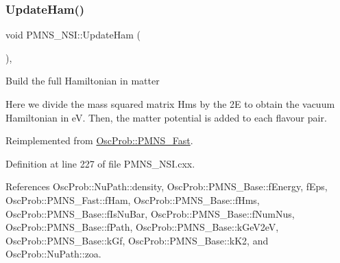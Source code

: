 \subsubsection{\texorpdfstring{Update\+Ham()}{UpdateHam()}}
{\footnotesize\ttfamily void P\+M\+N\+S\+\_\+\+N\+S\+I\+::\+Update\+Ham (\begin{DoxyParamCaption}{ }\end{DoxyParamCaption})\hspace{0.3cm}{\ttfamily [protected]}, {\ttfamily [virtual]}}

Build the full Hamiltonian in matter

Here we divide the mass squared matrix Hms by the 2E to obtain the vacuum Hamiltonian in eV. Then, the matter potential is added to each flavour pair. 

Reimplemented from \hyperlink{classOscProb_1_1PMNS__Fast_a16248082308f9d2c332ebf1be0aa90c3}{Osc\+Prob\+::\+P\+M\+N\+S\+\_\+\+Fast}.



Definition at line 227 of file P\+M\+N\+S\+\_\+\+N\+S\+I.\+cxx.



References Osc\+Prob\+::\+Nu\+Path\+::density, Osc\+Prob\+::\+P\+M\+N\+S\+\_\+\+Base\+::f\+Energy, f\+Eps, Osc\+Prob\+::\+P\+M\+N\+S\+\_\+\+Fast\+::f\+Ham, Osc\+Prob\+::\+P\+M\+N\+S\+\_\+\+Base\+::f\+Hms, Osc\+Prob\+::\+P\+M\+N\+S\+\_\+\+Base\+::f\+Is\+Nu\+Bar, Osc\+Prob\+::\+P\+M\+N\+S\+\_\+\+Base\+::f\+Num\+Nus, Osc\+Prob\+::\+P\+M\+N\+S\+\_\+\+Base\+::f\+Path, Osc\+Prob\+::\+P\+M\+N\+S\+\_\+\+Base\+::k\+Ge\+V2eV, Osc\+Prob\+::\+P\+M\+N\+S\+\_\+\+Base\+::k\+Gf, Osc\+Prob\+::\+P\+M\+N\+S\+\_\+\+Base\+::k\+K2, and Osc\+Prob\+::\+Nu\+Path\+::zoa.


